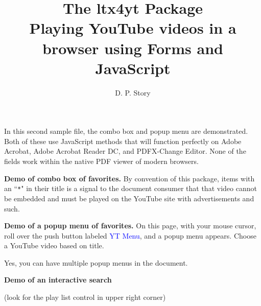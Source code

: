 \documentclass{article}
\title{The \texorpdfstring{\textsf{ltx4yt} Package\\[3pt]}{ltx4yt Package: }Playing YouTube videos in a browser using Forms and JavaScript}
\author{D. P. Story}
\begin{document}
\maketitle

In this second sample file, the combo box and popup menu are
demonstrated. Both of these use JavaScript methods that will
function perfectly on \textsf{Adobe Acrobat}, \textsf{Adobe
Acrobat Reader DC}, and \textsf{PDFX-Change Editor}. None of the fields
work within the native PDF viewer of modern browsers.

\textbf{Demo of combo box of favorites.} By convention of this
package, items with an ``\texttt{*}" in their title is a signal to
the document consumer that that video cannot be
embedded and must be played on the YouTube site with
advertisements and such. \vspace{-\parskip}
\begin{quote}
\olBdry
\end{quote}

\textbf{Demo of a popup menu of favorites.}
On this page, with your mouse cursor, roll over the push button labeled \textcolor{blue}{\textsf{YT Menu}}, and a popup
menu appears. Choose a YouTube video based on title.

 Yes, you can have multiple popup menus in the document.

\textbf{Demo of an interactive search}\\[3pt]
\ytInputQuery{1.5in}{11bp}\olBdry
\ytSearch{}{11bp}\olBdry
\ytClearQuery{}{11bp}

 (look for the play list control in upper right corner)

\end{document}
